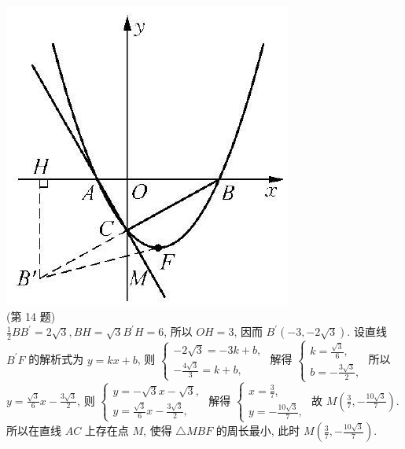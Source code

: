 \documentclass[10pt]{article}
\begin{document}
\begin{enumerate}
\includegraphics[max width=\textwidth, center]{2024_10_30_1bf34f7aeb61f11d11d3g-131}\\
(第 14 题)\\
$\frac{1}{2} B B^{\prime}=2 \sqrt{3}, B H=\sqrt{3} B^{\prime} H=6$, 所以 $O H=3$, 因而 $B^{\prime}(-3,-2 \sqrt{3})$. 设直线 $B^{\prime} F$ 的解析式为 $y=k x+b$, 则 $\left\{\begin{array}{l}-2 \sqrt{3}=-3 k+b, \\ -\frac{4 \sqrt{3}}{3}=k+b,\end{array}\right.$ 解得 $\left\{\begin{array}{l}k=\frac{\sqrt{3}}{6}, \\ b=-\frac{3 \sqrt{3}}{2},\end{array}\right.$ 所以 $y=\frac{\sqrt{3}}{6} x-\frac{3 \sqrt{3}}{2}$, 则 $\left\{\begin{array}{l}y=-\sqrt{3} x-\sqrt{3}, \\ y=\frac{\sqrt{3}}{6} x-\frac{3 \sqrt{3}}{2},\end{array}\right.$ 解得 $\left\{\begin{array}{l}x=\frac{3}{7}, \\ y=-\frac{10 \sqrt{3}}{7},\end{array}\right.$ 故 $M\left(\frac{3}{7},-\frac{10 \sqrt{3}}{7}\right)$. 所以在直线 $A C$ 上存在点 $M$, 使得 $\triangle M B F$ 的周长最小, 此时 $M\left(\frac{3}{7},-\frac{10 \sqrt{3}}{7}\right)$.

\end{enumerate}
\end{document}
